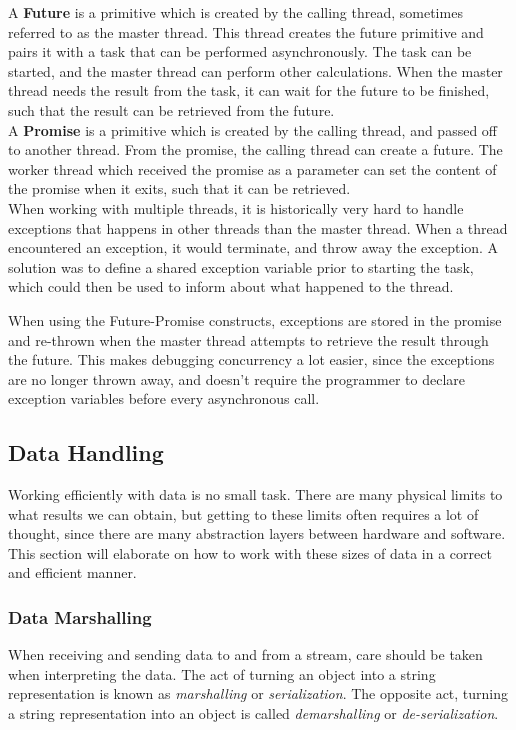 \documentclass[a4paper]{article}
\begin{document}
A \textbf{Future} is a primitive which is created by the calling thread, sometimes referred to as the master thread. This thread creates the future primitive and pairs it with a task that can be performed asynchronously. The task can be started, and the master thread can perform other calculations. When the master thread needs the result from the task, it can wait for the future to be finished, such that the result can be retrieved from the future.\\

A \textbf{Promise} is a primitive which is created by the calling thread, and passed off to another thread. From the promise, the calling thread can create a future. The worker thread which received the promise as a parameter can set the content of the promise when it exits, such that it can be retrieved.\\

When working with multiple threads, it is historically very hard to handle exceptions that happens in other threads than the master thread. When a thread encountered an exception, it would terminate, and throw away the exception. A solution was to define a shared exception variable prior to starting the task, which could then be used to inform about what happened to the thread. 

When using the Future-Promise constructs, exceptions are stored in the promise and re-thrown when the master thread attempts to retrieve the result through the future. This makes debugging concurrency a lot easier, since the exceptions are no longer thrown away, and doesn't require the programmer to declare exception variables before every asynchronous call.


\newpage
\subsection{Data Handling}
Working efficiently with data is no small task. There are many physical limits to what results we can obtain, but getting to these limits often requires a lot of thought, since there are many abstraction layers between hardware and software. This section will elaborate on how to work with these sizes of data in a correct and efficient manner.


\subsubsection{Data Marshalling}
When receiving and sending data to and from a stream, care should be taken when interpreting the data. The act of turning an object into a string representation is known as \textit{marshalling} or \textit{serialization}. The opposite act, turning a string representation into an object is called \textit{demarshalling} or \textit{de-serialization}.\\
\end{document}

